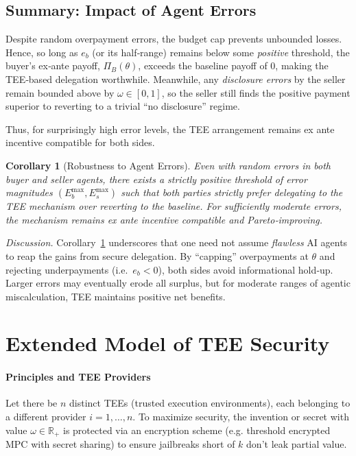 \documentclass{article}
\newtheorem{corollary}{Corollary}
\begin{document}
\subsection{Summary: Impact of Agent Errors}

Despite random overpayment errors, the budget cap 
prevents unbounded losses.  
Hence, so long as $e_b$ (or its half‐range) remains below some \emph{positive} 
threshold, the buyer’s ex‐ante payoff, $\Pi_B(\theta)$, exceeds the baseline 
payoff of $0$, making the TEE‐based delegation worthwhile.  
Meanwhile, any \emph{disclosure errors} by the seller remain bounded above 
by $\omega \in [0,1]$, so the seller still finds the positive payment 
superior to reverting to a trivial “no disclosure” regime.  

Thus, for surprisingly high error levels, the TEE arrangement remains ex ante incentive compatible for both sides. 

\begin{corollary}[Robustness to Agent Errors]
\label{cor:robust-errors}
Even with random errors in both buyer and seller agents, 
there exists a strictly positive threshold of error magnitudes 
$(E_b^{\max}, E_s^{\max})$ 
such that \emph{both} parties strictly prefer delegating 
to the TEE mechanism over reverting to the baseline.  
For sufficiently moderate errors, the mechanism remains ex ante 
incentive compatible and Pareto‐improving.
\end{corollary}

\noindent
\emph{Discussion.}\;
Corollary~\ref{cor:robust-errors} underscores that one need not assume 
\emph{flawless} AI agents to reap the gains from secure delegation.  
By ``capping'' overpayments at \(\theta\) and rejecting underpayments 
(i.e.\ $e_b<0$), both sides avoid informational hold‐up.  Larger errors may eventually erode all surplus, 
but for moderate ranges of agentic miscalculation, TEE maintains 
positive net benefits.

\section{Extended Model of TEE Security}
\label{sec:TEE-security-appendix}
\paragraph{Principles and TEE Providers}
Let there be $n$ distinct TEEs (trusted execution environments), each belonging to a different provider $i = 1,\dots,n$. To maximize security, the invention or secret with value $\omega \in \mathbb{R}_{+}$ is protected via an encryption scheme (e.g. threshold encrypted MPC with secret sharing) to ensure jailbreaks short of $k$ don't leak partial value. 
\end{document}
